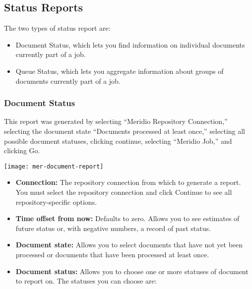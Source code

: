 \begin{changemargin}{1.5in}{0in}
\subsection{Status Reports}

The two types of status report are:

\begin{itemize}

\item Document Status, which lets you find information on individual
documents currently part of a job.

\item Queue Status, which lets you aggregate information about groups
of documents currently part of a job.

\end{itemize}

\subsubsection{Document Status}

This report was generated by selecting ``Meridio Repository
Connection,'' selecting the document state ``Documents processed at
least once,'' selecting all possible document statuses, clicking
continue, selecting ``Meridio Job,'' and clicking Go.

\texttt{[image: mer-document-report]}

\begin{itemize}

\item \textbf{Connection:} The repository connection from which to 
generate a report. You must select the repository connection and click
Continue to see all repository-specific options. %

\item \textbf{Time offset from now:} Defaults to zero. Allows you to
see estimates of future status or, with negative numbers, a record of
past status.

\item \textbf{Document state:} Allows you to select documents that
have not yet been processed or documents that have been processed
at least once.

\item \textbf{Document status:} Allows you to choose one or more 
statuses of document to report on. The statuses you can choose are:

\begin{itemize}


\end{itemize}
\end{itemize}
\end{changemargin}
